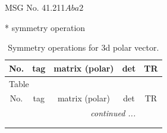 \documentclass[fleqn,8pt]{jsarticle}
\begin{document}
\setcounter{MaxMatrixCols}{32}

\renewcommand{\tablename}{Table~}
\renewcommand{\figurename}{Figure~}
\begin{center}
\LARGE
MSG No. 41.211\quad$Aba2$
\end{center}
* symmetry operation
\renewcommand{\arraystretch}{1.3}
\begin{longtable}{ccccc}
\caption{Symmetry operations for 3d polar vector.}
 \\
 \hline \hline
No. & tag & matrix (polar) & det & TR \\ \hline \endfirsthead

\multicolumn{4}{l}{\tablename\ \thetable{}} \\
 \hline \hline
No. & tag & matrix (polar) & det & TR \\ \hline \endhead

 \hline \hline
\multicolumn{4}{r}{\footnotesize\it continued ...} \\ \endfoot

 \hline \hline
\multicolumn{4}{r}{} \\ \endlastfoot


\end{longtable}
\end{document}

